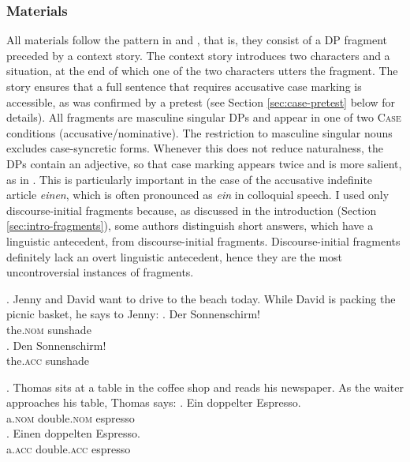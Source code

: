 \subsubsection{Materials}
\label{sec:case-materials}
All materials follow the pattern in \Next and \NNext, that is, they consist of a DP fragment preceded by a context story. The context story introduces two characters and a situation, at the end of which one of the two characters utters the fragment. The story ensures that a full sentence that requires accusative case marking is accessible, as was confirmed by a pretest (see Section \ref{sec:case-pretest} below for details). All fragments are masculine singular DPs and appear in one of two \textsc{Case} conditions (accusative/nominative). The restriction to masculine singular nouns excludes case-syncretic forms. Whenever this does not reduce naturalness, the DPs contain an adjective, so that case marking appears twice and is more salient, as in \NNext. This is particularly important in the case of the accusative indefinite article \textit{einen}, which is often pronounced as \textit{ein} in colloquial speech. I used only discourse-initial fragments because, as discussed in the introduction (Section \ref{sec:intro-fragments}), some authors \citep[e.g.][]{klein1993, reich2011} distinguish short answers, which have a linguistic antecedent, from discourse-initial fragments. Discourse-initial fragments definitely lack an overt linguistic antecedent, hence they are the most uncontroversial instances of fragments.

\ex. Jenny and David want to drive to the beach today. While David is packing the picnic basket, he says to Jenny: 
\ag. Der Sonnenschirm!\\ 
the.\textsc{nom} sunshade\\
\bg. Den Sonnenschirm!\\
the.\textsc{acc} sunshade\\

\ex. Thomas sits at a table in the coffee shop and reads his newspaper. As the waiter approaches his table, Thomas says:\label{ex:fragments-item-xplease}
\ag. Ein doppelter Espresso.\\
a.\textsc{nom} double.\textsc{nom} espresso\\
 
\bg. Einen doppelten Espresso.\\
a.\textsc{acc} double.\textsc{acc} espresso\\
 

